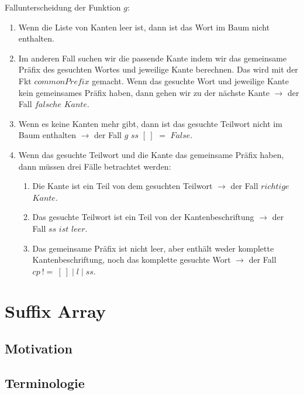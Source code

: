 \documentclass[12pt]{report}
\begin{document}
Fallunterscheidung der Funktion $g$:
\begin{enumerate}
    \item Wenn die Liste von Kanten leer ist, dann ist das Wort im Baum nicht enthalten.
    \item Im anderen Fall suchen wir die passende Kante indem wir das gemeinsame Präfix des gesuchten Wortes und jeweilige Kante berechnen. Das wird mit der Fkt $commonPrefix$ gemacht. Wenn das gesuchte Wort und jeweilige Kante kein gemeinsames Präfix haben, dann gehen wir zu der nächste Kante $\rightarrow$ der Fall $falsche$ $Kante$.
    \item Wenn es keine Kanten mehr gibt, dann ist das gesuchte Teilwort nicht im Baum enthalten $\rightarrow$ der Fall $g$ $ss$ $[\:]$ $=$ $False$.
    \item Wenn das gesuchte Teilwort und die Kante das gemeinsame Präfix haben, dann müssen drei Fälle betrachtet werden:
    \begin{enumerate}
        \item Die Kante ist ein Teil von dem gesuchten Teilwort $\rightarrow$ der Fall $richtige$ $Kante$.
        \item Das gesuchte Teilwort ist ein Teil von der Kantenbeschriftung $\rightarrow$ der Fall $ss$ $ist$ $leer$.
        \item Das gemeinsame Präfix ist nicht leer, aber enthält weder komplette Kantenbeschriftung, noch das komplette gesuchte Wort $\rightarrow$ der Fall $cp\:!=\:[\:]\mid l \mid ss$.
    \end{enumerate}
\end{enumerate}

\chapter{Suffix Array}
\label{sec:SuffixArray}

\section{Motivation}
\label{sec:Motivation}

\section{Terminologie}
\label{sec:SuffixArrayTerminologie}
\end{document}
